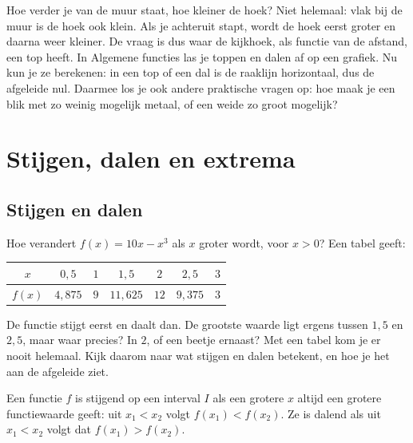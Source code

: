 Hoe verder je van de muur staat, hoe kleiner de hoek? Niet helemaal: vlak bij de muur is de hoek ook klein. Als je achteruit stapt, wordt de hoek eerst groter en daarna weer kleiner. De vraag is dus waar de kijkhoek, als functie van de afstand, een top heeft. In Algemene functies las je toppen en dalen af op een grafiek. Nu kun je ze berekenen: in een top of een dal is de raaklijn horizontaal, dus de afgeleide nul. Daarmee los je ook andere praktische vragen op: hoe maak je een blik met zo weinig mogelijk metaal, of een weide zo groot mogelijk?

\begin{oefeningen}[Start]

\end{oefeningen}

\section{Stijgen, dalen en extrema}

\subsection{Stijgen en dalen}

Hoe verandert $f(x) = 10x - x^3$ als $x$ groter wordt, voor $x > 0$? Een tabel geeft:
\begin{center}{\renewcommand{\arraystretch}{1.2}%
\begin{tabular}{c|cccccc}
$x$ & $0{,}5$ & $1$ & $1{,}5$ & $2$ & $2{,}5$ & $3$ \\ \hline
$f(x)$ & $4{,}875$ & $9$ & $11{,}625$ & $12$ & $9{,}375$ & $3$
\end{tabular}}\end{center}
De functie stijgt eerst en daalt dan. De grootste waarde ligt ergens tussen $1{,}5$ en $2{,}5$, maar waar precies? In $2$, of een beetje ernaast? Met een tabel kom je er nooit helemaal. Kijk daarom naar wat stijgen en dalen betekent, en hoe je het aan de afgeleide ziet.

Een functie $f$ is stijgend op een interval $I$ als een grotere $x$ altijd een grotere functiewaarde geeft: uit $x_1 < x_2$ volgt $f(x_1) < f(x_2)$. Ze is dalend als uit $x_1 < x_2$ volgt dat $f(x_1) > f(x_2)$.


